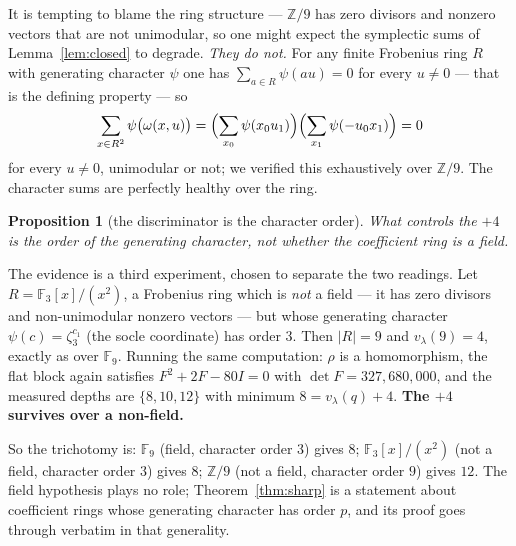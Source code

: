 \documentclass[11pt]{article}
\theoremstyle{plain}
\newtheorem{proposition}[theorem]{Proposition}
\theoremstyle{definition}
\newcommand{\FF}{\mathbb F}
\newcommand{\ZZ}{\mathbb Z}
\newcommand{\vlam}{v_\lambda}
\begin{document}
It is tempting to blame the ring structure --- $\ZZ/9$ has zero divisors and
nonzero vectors that are not unimodular, so one might expect the symplectic
sums of Lemma~\ref{lem:closed} to degrade. \emph{They do not.} For any finite
Frobenius ring $R$ with generating character $\psi$ one has
$\sum_{a\in R}\psi(au)=0$ for every $u\neq0$ --- that is the defining property
--- so
\[
\sum_{x\in R^2}\psi\bigl(\omega(x,u)\bigr)
=\Bigl(\sum_{x_0}\psi(x_0u_1)\Bigr)\Bigl(\sum_{x_1}\psi(-u_0x_1)\Bigr)=0
\]
for every $u\neq0$, unimodular or not; we verified this exhaustively over
$\ZZ/9$. The character sums are perfectly healthy over the ring.

\begin{proposition}[the discriminator is the character order]\label{prop:scope}
What controls the $+4$ is the order of the generating character, not whether
the coefficient ring is a field.
\end{proposition}

The evidence is a third experiment, chosen to separate the two readings. Let
$R=\FF_3[x]/(x^2)$, a Frobenius ring which is \emph{not} a field --- it has
zero divisors and non-unimodular nonzero vectors --- but whose generating
character $\psi(c)=\zeta_3^{c_1}$ (the socle coordinate) has order $3$. Then
$|R|=9$ and $\vlam(9)=4$, exactly as over $\FF_9$. Running the same
computation: $\rho$ is a homomorphism, the flat block again satisfies
$F^2+2F-80I=0$ with $\det F=327{,}680{,}000$, and the measured depths are
$\{8,10,12\}$ with minimum $8=\vlam(q)+4$. \textbf{The $+4$ survives over a
non-field.}

So the trichotomy is: $\FF_9$ (field, character order $3$) gives $8$;
$\FF_3[x]/(x^2)$ (not a field, character order $3$) gives $8$; $\ZZ/9$ (not a
field, character order $9$) gives $12$. The field hypothesis plays no role;
Theorem~\ref{thm:sharp} is a statement about coefficient rings whose generating
character has order $p$, and its proof goes through verbatim in that
generality.
\end{document}
